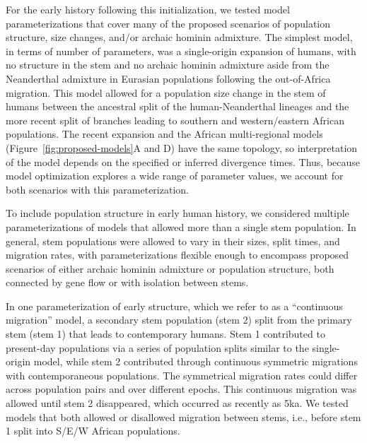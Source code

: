 \documentclass[]{article}
\begin{document}
For the early history following this initialization, 
we tested model parameterizations that cover many of the
proposed scenarios of population structure, size changes, and/or archaic
hominin admixture. The simplest model, in terms of number of parameters, was a
single-origin expansion of humans, with no structure in the stem and no archaic
hominin admixture aside from the Neanderthal admixture in Eurasian populations
following the out-of-Africa migration. This model allowed for a population size
change in the stem of humans between the ancestral split of the
human-Neanderthal lineages and the more recent split of branches leading to
southern and western/eastern African populations. The recent expansion and the
African multi-regional models (Figure~\ref{fig:proposed-models}A and D) have
the same topology, so interpretation of the model depends on the specified or
inferred divergence times. Thus, because model optimization explores a wide
range of parameter values, we account for both scenarios with this
parameterization.

To include population structure in early human history, we considered multiple
parameterizations of models that allowed more than a single stem population. In
general, stem populations were allowed to vary in their sizes, split times, and
migration rates, with parameterizations flexible enough to encompass proposed
scenarios of either archaic hominin admixture or population structure, both connected
by gene flow or with isolation between stems.

In one parameterization of early structure, which we refer to as a “continuous
migration” model, a secondary stem population (stem 2) split from the primary
stem (stem 1) that leads to contemporary humans. Stem 1 contributed to present-day
populations via a series of population splits similar to the single-origin
model, while stem 2 contributed through continuous symmetric migrations with
contemporaneous populations. The symmetrical migration rates could differ
across population pairs and over different epochs. This continuous migration
was allowed until stem 2 disappeared, which occurred as recently as 5ka. We
tested models that both allowed or disallowed migration between stems, i.e.,
before stem 1 split into S/E/W African populations.
\end{document}
